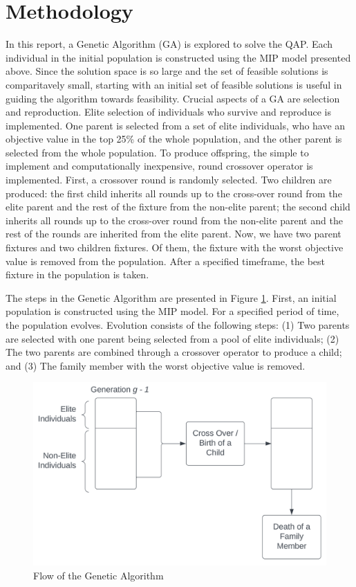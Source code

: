 \section{Methodology}
In this report, a Genetic Algorithm (GA) is explored to solve the QAP. Each individual in the initial population is constructed using the MIP model presented above. Since the solution space is so large and the set of feasible solutions is comparitavely small, starting with an initial set of feasible solutions is useful in guiding the algorithm towards feasibility. Crucial aspects of a GA are selection and reproduction. Elite selection of individuals who survive and reproduce is implemented. One parent is selected from a set of elite individuals, who have an objective value in the top 25\% of the whole population, and the other parent is selected from the whole population. To produce offspring, the simple to implement and computationally inexpensive, round crossover operator is implemented. First, a crossover round is randomly selected. Two children are produced: the first child inherits all rounds up to the cross-over round from the elite parent and the rest of the fixture from the non-elite parent; the second child inherits all rounds up to the cross-over round from the non-elite parent and the rest of the rounds are inherited from the elite parent. Now, we have two parent fixtures and two children fixtures. Of them, the fixture with the worst objective value is removed from the population. After a specified timeframe, the best fixture in the population is taken. 

\bigskip
The steps in the Genetic Algorithm are presented in Figure \ref{fig:flowchart}. First, an initial population is constructed using the MIP model. For a specified period of time, the population evolves. Evolution consists of the following steps: (1) Two parents are selected with one parent being selected from a pool of elite individuals; (2) The two parents are combined through a crossover operator to produce a child; and (3) The family member with the worst objective value is removed. 

\begin{figure}[H]
    \centering
    \includegraphics[width=\textwidth]{Figures/GA_flowchart.png}
    \caption{Flow of the Genetic Algorithm}
    \label{fig:flowchart}
\end{figure}

